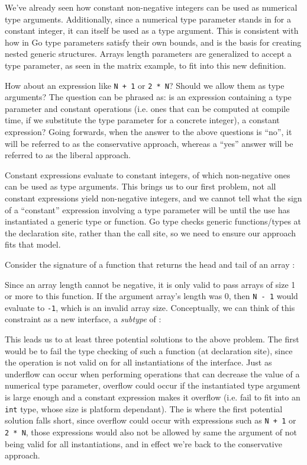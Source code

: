 We've already seen how constant non-negative integers can be used as numerical
type arguments. Additionally, since a numerical type parameter stands in for a
constant integer, it can itself be used as a type argument. This is consistent
with how in Go type parameters satisfy their own bounds, and is the basis for
creating nested generic structures. Arrays length parameters are generalized to
accept a  type parameter, as seen in the matrix example, to fit into
this new definition.

How about an expression like \texttt{N + 1} or \texttt{2 * N}? Should we allow
them as  type arguments? The question can be phrased as: is an
expression containing a  type parameter and constant operations (i.e.
ones that can be computed at compile time, if we substitute the type parameter
for a concrete integer), a constant expression? Going forwards, when the answer
to the above questions is ``no'', it will be referred to as the conservative
approach, whereas a ``yes'' answer will be referred to as the liberal approach.

Constant expressions evaluate to constant integers, of which non-negative ones
can be used as  type arguments. This brings us to our first problem,
not all constant expressions yield non-negative integers, and we cannot tell
what the sign of a ``constant'' expression involving a type parameter will be
until the use has instantiated a generic type or function. Go type checks
generic functions/types at the declaration site, rather than the call site, so
we need to ensure our approach fits that model.

Consider the signature of a function that returns the head and tail of an array
\autocite{rustConstBlog}:


Since an array length cannot be negative, it is only valid to pass arrays of
size 1 or more to this function. If the argument array's length was 0, then
\texttt{N - 1} would evaluate to \texttt{-1}, which is an invalid array size.
Conceptually, we can think of this constraint as a new interface, a
\emph{subtype} of :


This leads us to at least three potential solutions to the above problem. The
first would be to fail the type checking of such a function (at declaration
site), since the operation is not valid on for all instantiations of the
 interface. Just as underflow can occur when performing operations
that can decrease the value of a numerical type parameter, overflow could occur
if the instantiated type argument is large enough and a constant expression
makes it overflow (i.e. fail to fit into an \texttt{int} type, whose size is
platform dependant). The is where the first potential solution falls short,
since overflow could occur with expressions such as \texttt{N + 1} or \texttt{2
    * N}, those expressions would also not be allowed by same the argument of not
being valid for all instantiations, and in effect we're back to the conservative
approach.

